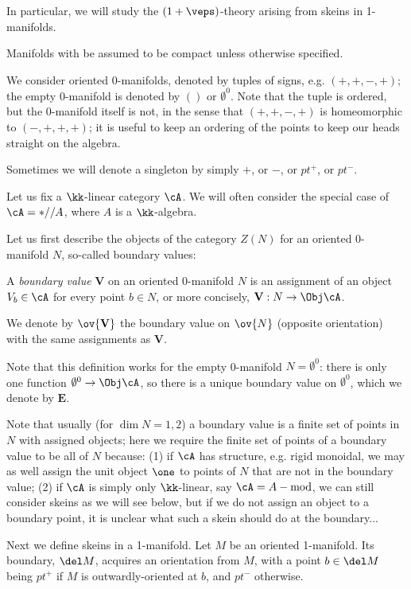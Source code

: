 \documentclass[12pt]{article}
\newcommand{\empt}[1]{{\emptyset^{#1}}}
\newcommand{\VV}{{\mathbf{V}}}
\newcommand{\EE}{{\mathbf{E}}}
\begin{document}
In particular, we will study the $(1+\veps)$-theory
arising from skeins in 1-manifolds.

Manifolds with be assumed to be compact
unless otherwise specified.

We consider oriented 0-manifolds,
denoted by tuples of signs, e.g. $(+,+,-,+)$;
the empty 0-manifold is denoted by $()$ or $\empt{0}$.
Note that the tuple is ordered, but the 0-manifold itself
is not, in the sense that
$(+,+,-,+)$ is homeomorphic to $(-,+,+,+)$;
it is useful to keep an ordering of the points
to keep our heads straight on the algebra.

Sometimes we will denote a singleton by simply $+$,
or $-$, or $pt^+$, or $pt^-$.

Let us fix a $\kk$-linear category $\cA$.
We will often consider the special case of
$\cA = *//A$, where $A$ is a $\kk$-algebra.

Let us first describe the objects of the category
$Z(N)$ for an oriented 0-manifold $N$,
so-called boundary values:

\begin{definition}
A \emph{boundary value} $\VV$ on an oriented 0-manifold $N$
is an assignment of an object $V_b \in \cA$
for every point $b \in N$,
or more concisely, $\VV: N \to \Obj \cA$.

We denote by $\ov{\VV}$ the boundary value on $\ov{N}$
(opposite orientation) with the same assignments as $\VV$.
\end{definition}

Note that this definition works for the empty 0-manifold
$N = \empt{0}$: there is only one function $\empt{0} \to \Obj \cA$,
so there is a unique boundary value on $\empt{0}$,
which we denote by $\EE$.

Note that usually (for $\dim N = 1,2$)
a boundary value is a finite set of points in $N$
with assigned objects;
here we require the finite set of points of a boundary value
to be all of $N$ because:
(1) if $\cA$ has structure, e.g. rigid monoidal,
we may as well assign the unit object $\one$ to points
of $N$ that are not in the boundary value;
(2) if $\cA$ is simply only $\kk$-linear,
say $\cA = A-\text{mod}$,
we can still consider skeins as we will see below,
but if we do not assign an object to a boundary point,
it is unclear what such a skein should do at the boundary...


Next we define skeins in a 1-manifold.
Let $M$ be an oriented 1-manifold.
Its boundary, $\del M$, acquires an orientation from $M$,
with a point $b \in \del M$ being $pt^+$ if $M$
is outwardly-oriented at $b$, and $pt^-$ otherwise.
\end{document}
